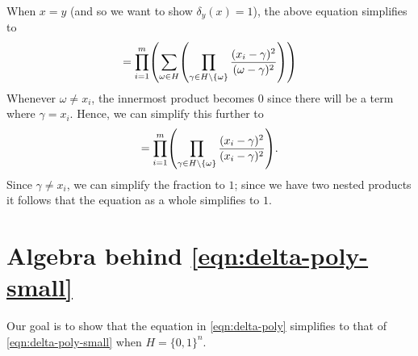 \documentclass[english,12pt]{reedthesis}
\theoremstyle{plain}
\theoremstyle{definition}
\theoremstyle{remark}
\begin{document}
\begin{appendices}
When $x = y$ (and so we want to show $\delta_{y}(x) = 1$), the above equation
simplifies to
\begin{equation}
  [x = y] = \prod_{i = 1}^{m}\mleft(\sum_{\omega \in H}\mleft(
    \prod_{\gamma \in H \setminus \{\omega\}}\frac{(x_{i} - \gamma)^{2}}{(\omega - \gamma)^{2}}
  \mright)\mright)
\end{equation}
Whenever $\omega \ne x_{i}$, the innermost product becomes $0$ since there will be a
term where $\gamma = x_{i}$. Hence, we can simplify this further to
\begin{equation}
  [x = y] = \prod_{i=1}^{m}\mleft(\prod_{\gamma \in H \setminus \{\omega\}}\frac{(x_{i} - \gamma)^{2}}{(x_{i} - \gamma)^{2}}\mright).
\end{equation}
Since $\gamma \ne x_{i}$, we can simplify the fraction to $1$; since we have two nested
products it follows that the equation as a whole simplifies to $1$.

\section{Algebra behind \cref{eqn:delta-poly-small}}\label{sec:delta-poly-small}

Our goal is to show that the equation in \cref{eqn:delta-poly} simplifies to
that of \cref{eqn:delta-poly-small} when $H = \{0, 1\}^{n}$.


\end{appendices}
\end{document}

